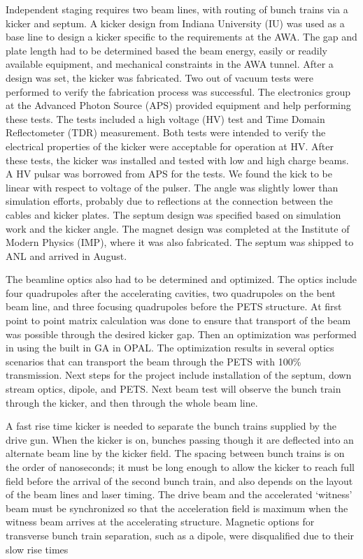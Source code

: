 


Independent staging requires two beam lines, with routing of bunch trains via a kicker and septum. 
A kicker design from Indiana University (IU) was used as a base line to design a kicker specific to the
requirements at the AWA. The gap and plate length had to be determined based the beam energy, 
easily or readily available equipment, and mechanical constraints in the AWA tunnel. 
After a design was set, the kicker was fabricated. 
Two out of vacuum tests were performed to verify the fabrication process was successful.
The electronics group at the Advanced Photon Source (APS) provided equipment and help performing these tests.
The tests included a high voltage (HV) test and Time Domain Reflectometer (TDR) measurement.
Both tests were intended to verify the electrical properties of the kicker were acceptable for operation at HV.
After these tests, the kicker was installed and tested with low and high charge beams. 
A HV pulsar was borrowed from APS for the tests. 
We found the kick to be linear with respect to voltage of the pulser. 
The angle was slightly lower than simulation efforts, probably due to reflections at the
connection between the cables and kicker plates. 
The septum design was specified based on simulation work and the kicker angle.
The magnet design was completed at the Institute of Modern Physics (IMP), 
where it was also fabricated. The septum was shipped to ANL and arrived in August. 

The beamline optics also had to be determined and optimized.
The optics include four quadrupoles after the accelerating cavities, 
two quadrupoles on the bent beam line, and three focusing quadrupoles
before the PETS structure.
At first point to point matrix calculation was done to ensure that transport of the
beam was possible through the desired kicker gap.
Then an optimization was performed in using the built in GA in OPAL. 
The optimization results in several optics scenarios that can transport 
the beam through the PETS with 100\% transmission.
Next steps for the project include installation of the septum, 
down stream optics, dipole, and PETS. 
Next beam test will observe the bunch train through the kicker, 
and then through the whole beam line. 



A fast rise time kicker is needed to separate the 
bunch trains supplied by the drive gun.  When the kicker is on, 
bunches passing though it are deflected into an alternate beam line by the kicker field.
The spacing between bunch trains is on the order of nanoseconds; 
it must be long enough to allow the kicker to reach full field before the arrival of the second bunch train, 
and also depends on the layout of the beam lines and laser timing.  
The drive beam and the accelerated `witness' beam must be synchronized so that the 
acceleration field is maximum when the witness beam arrives at the accelerating structure.
Magnetic options for transverse bunch train separation, 
such as a dipole, were disqualified due to their slow rise times 

